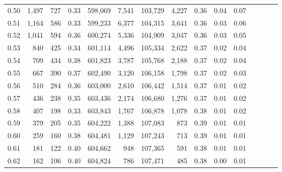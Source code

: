 \begin{tabular}{rrrcrrrrrrrrrrr}
0.50 &   1,497 &    727 &                                       0.33 &  598,069 &    7,541 &  103,729 &    4,227 &  0.36 &  0.04 &                         0.07 \\
0.51 &   1,164 &    586 &                                       0.33 &  599,233 &    6,377 &  104,315 &    3,641 &  0.36 &  0.03 &                         0.06 \\
0.52 &   1,041 &    594 &                                       0.36 &  600,274 &    5,336 &  104,909 &    3,047 &  0.36 &  0.03 &                         0.05 \\
0.53 &     840 &    425 &                                       0.34 &  601,114 &    4,496 &  105,334 &    2,622 &  0.37 &  0.02 &                         0.04 \\
0.54 &     709 &    434 &                                       0.38 &  601,823 &    3,787 &  105,768 &    2,188 &  0.37 &  0.02 &                         0.04 \\
0.55 &     667 &    390 &                                       0.37 &  602,490 &    3,120 &  106,158 &    1,798 &  0.37 &  0.02 &                         0.03 \\
0.56 &     510 &    284 &                                       0.36 &  603,000 &    2,610 &  106,442 &    1,514 &  0.37 &  0.01 &                         0.02 \\
0.57 &     436 &    238 &                                       0.35 &  603,436 &    2,174 &  106,680 &    1,276 &  0.37 &  0.01 &                         0.02 \\
0.58 &     407 &    198 &                                       0.33 &  603,843 &    1,767 &  106,878 &    1,078 &  0.38 &  0.01 &                         0.02 \\
0.59 &     379 &    205 &                                       0.35 &  604,222 &    1,388 &  107,083 &      873 &  0.39 &  0.01 &                         0.01 \\
0.60 &     259 &    160 &                                       0.38 &  604,481 &    1,129 &  107,243 &      713 &  0.39 &  0.01 &                         0.01 \\
0.61 &     181 &    122 &                                       0.40 &  604,662 &      948 &  107,365 &      591 &  0.38 &  0.01 &                         0.01 \\
0.62 &     162 &    106 &                                       0.40 &  604,824 &      786 &  107,471 &      485 &  0.38 &  0.00 &                         0.01 \\

\end{tabular}
